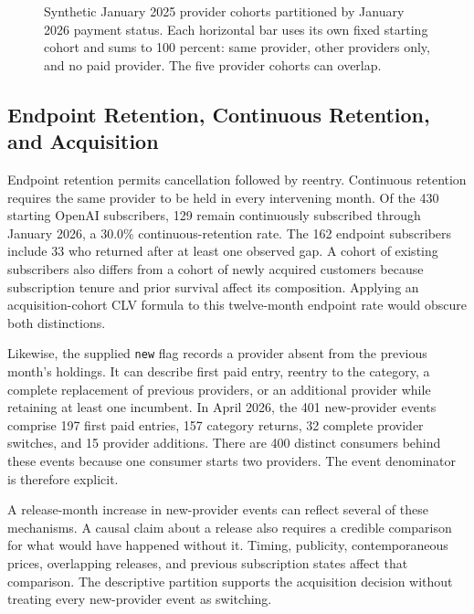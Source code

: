 \begin{figure}[htbp]
\centering

\caption{Synthetic January 2025 provider cohorts partitioned by January 2026 payment status. Each horizontal bar uses its own fixed starting cohort and sums to 100 percent: same provider, other providers only, and no paid provider. The five provider cohorts can overlap.}\label{fig:M04_genai_cohorts}
\end{figure}

\hypertarget{M04-endpoint-retention-continuous-retention-and-acquisition}{%
\subsection{Endpoint Retention, Continuous Retention, and
Acquisition}\label{M04-endpoint-retention-continuous-retention-and-acquisition}}

\noindent Endpoint retention permits cancellation followed by reentry. Continuous
retention requires the same provider to be held in every intervening
month. Of the 430 starting OpenAI subscribers, 129 remain continuously
subscribed through January 2026, a 30.0\% continuous-retention rate. The
162 endpoint subscribers include 33 who returned after at least one
observed gap. A cohort of existing subscribers also differs from a
cohort of newly acquired customers because subscription tenure and prior
survival affect its composition. Applying an acquisition-cohort CLV
formula to this twelve-month endpoint rate would obscure both
distinctions.

Likewise, the supplied \texttt{new} flag records a provider absent from
the previous month's holdings. It can describe first paid entry, reentry
to the category, a complete replacement of previous providers, or an
additional provider while retaining at least one incumbent. In April
2026, the 401 new-provider events comprise 197 first paid entries, 157
category returns, 32 complete provider switches, and 15 provider
additions. There are 400 distinct consumers behind these events because
one consumer starts two providers. The event denominator is therefore
explicit.

A release-month increase in new-provider events can reflect several of
these mechanisms. A causal claim about a release also requires a
credible comparison for what would have happened without it. Timing,
publicity, contemporaneous prices, overlapping releases, and previous
subscription states affect that comparison. The descriptive partition
supports the acquisition decision without treating every new-provider
event as switching.

